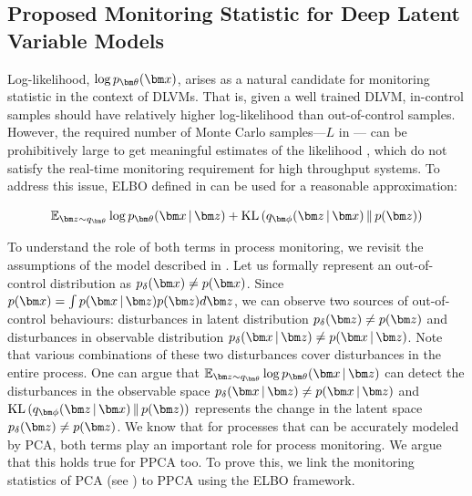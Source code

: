 \documentclass[journal, peerreview]{IEEEtran}
\begin{document}
\subsection{Proposed Monitoring Statistic for Deep Latent Variable Models}
\label{sec:proposed-statistic}


Log-likelihood, $\log \ptheta(\mbx)$, arises as a natural candidate for monitoring statistic in the context of DLVMs.
That is, given a well trained DLVM, in-control samples should have relatively higher log-likelihood than out-of-control samples.
However, the required number of Monte Carlo samples---$L$ in --- can be prohibitively large to get meaningful estimates of the likelihood \cite{Kingma2013-dl}, which do not satisfy the real-time monitoring requirement for high throughput systems. To address this issue, ELBO defined in  can be used for a reasonable approximation:

\begin{equation*}
    \E_{\mbz \sim q_{\mbtheta}} \log \decoding + \KL{\encoding}{p(\mbz)}
\end{equation*}

To understand the role of both terms in process monitoring, we revisit the assumptions of the model described in . Let us formally represent an out-of-control distribution as  $p_{\delta}(\mbx) \neq p(\mbx)$. Since $p(\mbx) = \int p(\mbx\g\mbz)p(\mbz) d\mbz$, we can observe two sources of out-of-control behaviours: disturbances in latent distribution $p_{\delta}(\mbz) \neq \pz$ and disturbances in observable distribution $p_{\delta}(\mbx \g \mbz) \neq p(\mbx \g \mbz)$. 
Note that various combinations of these two disturbances cover disturbances in the entire process. One can argue that $\E_{\mbz \sim q_{\mbtheta}} \log \decoding $ can detect the disturbances in the observable space $p_{\delta}(\mbx \g \mbz) \neq p(\mbx \g \mbz)$ and  $\KL{\encoding}{p(\mbz)}$ represents the change in the latent space $p_{\delta}(\mbz) \neq \pz$. 
We know that for processes that can be accurately modeled by PCA, both terms play an important role \cite{kim2003process} for process monitoring. 
We argue that this holds true for PPCA too.
To prove this, we link the monitoring statistics of PCA (see ) to PPCA using the ELBO framework.
\end{document}
